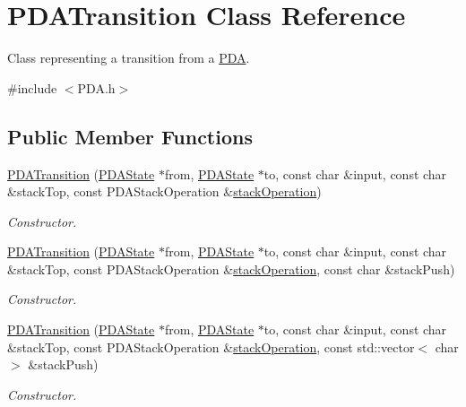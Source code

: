\hypertarget{class_p_d_a_transition}{\section{P\-D\-A\-Transition Class Reference}
\label{class_p_d_a_transition}
}


Class representing a transition from a \hyperlink{class_p_d_a}{P\-D\-A}.  




{\ttfamily \#include $<$P\-D\-A.\-h$>$}

\subsection*{Public Member Functions}
\begin{DoxyCompactItemize}
\item 
\hyperlink{class_p_d_a_transition_abbfb0059d8f657ad434e5b07d337e361}{P\-D\-A\-Transition} (\hyperlink{class_p_d_a_state}{P\-D\-A\-State} $\ast$from, \hyperlink{class_p_d_a_state}{P\-D\-A\-State} $\ast$to, const char \&input, const char \&stack\-Top, const P\-D\-A\-Stack\-Operation \&\hyperlink{class_p_d_a_transition_a66c5e45c981d66e326aac04749f5effa}{stack\-Operation})
\begin{DoxyCompactList}\small\item\em Constructor. \end{DoxyCompactList}\item 
\hyperlink{class_p_d_a_transition_a060bbd689533147e128fb7c4827fd801}{P\-D\-A\-Transition} (\hyperlink{class_p_d_a_state}{P\-D\-A\-State} $\ast$from, \hyperlink{class_p_d_a_state}{P\-D\-A\-State} $\ast$to, const char \&input, const char \&stack\-Top, const P\-D\-A\-Stack\-Operation \&\hyperlink{class_p_d_a_transition_a66c5e45c981d66e326aac04749f5effa}{stack\-Operation}, const char \&stack\-Push)
\begin{DoxyCompactList}\small\item\em Constructor. \end{DoxyCompactList}\item 
\hyperlink{class_p_d_a_transition_adf9edc281ee9ad54b07aea48ce85670e}{P\-D\-A\-Transition} (\hyperlink{class_p_d_a_state}{P\-D\-A\-State} $\ast$from, \hyperlink{class_p_d_a_state}{P\-D\-A\-State} $\ast$to, const char \&input, const char \&stack\-Top, const P\-D\-A\-Stack\-Operation \&\hyperlink{class_p_d_a_transition_a66c5e45c981d66e326aac04749f5effa}{stack\-Operation}, const std\-::vector$<$ char $>$ \&stack\-Push)
\begin{DoxyCompactList}\small\item\em Constructor. \end{DoxyCompactList}\item 

\end{DoxyCompactItemize}
